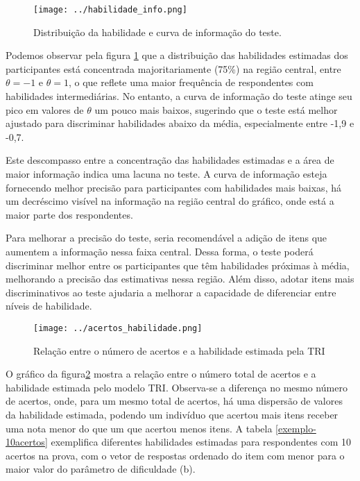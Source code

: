 \clearpage

\begin{figure}[H]
	\centering
	\caption{Distribuição da habilidade e curva de informação do teste.}
	\texttt{[image: ../habilidade\_info.png]}
		\parbox{\textwidth}{
		\centering %
	}
	\label{fig:info_habilidade}
\end{figure}

Podemos observar pela figura \ref{fig:info_habilidade} que a distribuição das habilidades estimadas dos participantes está concentrada majoritariamente (75\%) na região central, entre $\theta = -1$ e $\theta = 1$, o que reflete uma maior frequência de respondentes com habilidades intermediárias. No entanto, a curva de informação do teste atinge seu pico em valores de $\theta$ um pouco mais baixos, sugerindo que o teste está melhor ajustado para discriminar habilidades abaixo da média, especialmente entre -1,9 e -0,7.

Este descompasso entre a concentração das habilidades estimadas e a área de maior informação indica uma lacuna no teste. A curva de informação esteja fornecendo melhor precisão para participantes com habilidades mais baixas, há um decréscimo visível na informação na região central do gráfico, onde está a maior parte dos respondentes. 

Para melhorar a precisão do teste, seria recomendável a adição de itens que aumentem a informação nessa faixa central. Dessa forma, o teste poderá discriminar melhor entre os participantes que têm habilidades próximas à média, melhorando a precisão das estimativas nessa região. Além disso, adotar itens mais discriminativos ao teste ajudaria a melhorar a capacidade de diferenciar entre níveis de habilidade.

\begin{figure}[!hbt]
	\centering
		\caption{Relação entre o número de acertos e a habilidade estimada pela TRI}
	\texttt{[image: ../acertos\_habilidade.png]}
	\parbox{\textwidth}{
		\centering %
	}
	\label{fig:acertos_habilidade}
\end{figure}

O gráfico da figura\ref{fig:acertos_habilidade} mostra a relação entre o número total de acertos e a habilidade estimada pelo modelo TRI. Observa-se a diferença no mesmo número de acertos, onde, para um mesmo total de acertos, há uma dispersão de valores da habilidade estimada, podendo um indivíduo que acertou mais itens receber uma nota menor do que um que acertou menos itens. A tabela \ref{exemplo-10acertos} exemplifica diferentes habilidades estimadas para respondentes com 10 acertos na prova, com o vetor de respostas ordenado do item com menor para o maior valor do parâmetro de dificuldade (b).



